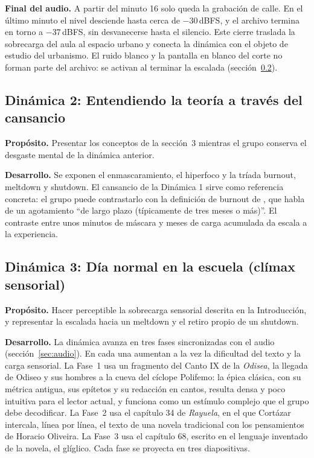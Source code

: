 \textbf{Final del audio.} A partir del minuto 16 solo queda la grabación de calle. En el último minuto el nivel desciende hasta cerca de $-30$\,dBFS, y el archivo termina en torno a $-37$\,dBFS, sin desvanecerse hasta el silencio. Este cierre traslada la sobrecarga del aula al espacio urbano y conecta la dinámica con el objeto de estudio del urbanismo. El ruido blanco y la pantalla en blanco del corte no forman parte del archivo: se activan al terminar la escalada (sección~\ref{sec:dinamica3}).

\subsection{Dinámica 2: Entendiendo la teoría a través del cansancio}

\textbf{Propósito.} Presentar los conceptos de la sección~3 mientras el grupo conserva el desgaste mental de la dinámica anterior.

\textbf{Desarrollo.} Se exponen el enmascaramiento, el hiperfoco y la tríada burnout, meltdown y shutdown. El cansancio de la Dinámica 1 sirve como referencia concreta: el grupo puede contrastarlo con la definición de burnout de \citet{raymaker2020}, que habla de un agotamiento \enquote{de largo plazo (típicamente de tres meses o más)}. El contraste entre unos minutos de máscara y meses de carga acumulada da escala a la experiencia.

\subsection{Dinámica 3: Día normal en la escuela (clímax sensorial)}
\label{sec:dinamica3}

\textbf{Propósito.} Hacer perceptible la sobrecarga sensorial descrita en la Introducción, y representar la escalada hacia un meltdown y el retiro propio de un shutdown.

\textbf{Desarrollo.} La dinámica avanza en tres fases sincronizadas con el audio (sección~\ref{sec:audio}). En cada una aumentan a la vez la dificultad del texto y la carga sensorial. La Fase~1 usa un fragmento del Canto IX de la \textit{Odisea}, la llegada de Odiseo y sus hombres a la cueva del cíclope Polifemo: la épica clásica, con su métrica antigua, sus epítetos y su redacción en cantos, resulta densa y poco intuitiva para el lector actual, y funciona como un estímulo complejo que el grupo debe decodificar. La Fase~2 usa el capítulo 34 de \textit{Rayuela}, en el que Cortázar intercala, línea por línea, el texto de una novela tradicional con los pensamientos de Horacio Oliveira. La Fase~3 usa el capítulo 68, escrito en el lenguaje inventado de la novela, el glíglico. Cada fase se proyecta en tres diapositivas.

